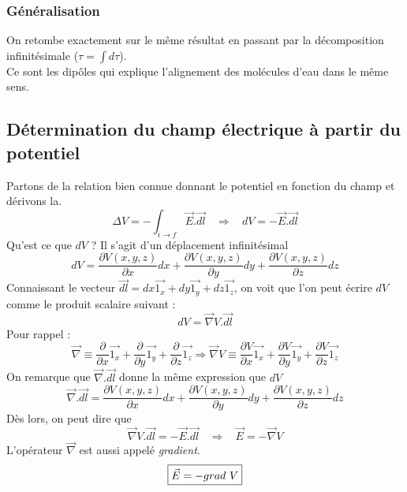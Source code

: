 \documentclass	[11pt, a4paper, openany]{book}
\begin{document}
\subsubsection{Généralisation}
On retombe exactement sur le même résultat en passant par la décomposition infinitésimale ($\tau = \int d\tau$).\\
Ce sont les dipôles qui explique l'alignement des molécules d'eau dans le même sens.

\subsection{Détermination du champ électrique à partir du potentiel}
Partons de la relation bien connue donnant le potentiel en fonction du champ et dérivons la.
\begin{equation}
\Delta V = - \int_{i\rightarrow f} \vec{E}.\vec{dl}\ \ \ \ \Rightarrow\ \ \ \ dV = - \vec{E}.\vec{dl}
\end{equation}
Qu'est ce que $dV$ ? Il s'agit d'un déplacement infinitésimal 
\begin{equation}
dV = \frac{\partial V(x,y,z)}{\partial x}dx + \frac{\partial V(x,y,z)}{\partial y}dy + \frac{\partial V(x,y,z)}{\partial z}dz
\end{equation}
Connaissant le vecteur $\vec{dl} = dx\vec{1_x} + dy\vec{1_y}+dz\vec{1_z}$, on voit que l'on peut écrire $dV$ comme le produit scalaire suivant :
\begin{equation}
dV = \vec{\nabla}V.\vec{dl}
\end{equation}
Pour rappel : 
\begin{equation}
\vec{\nabla} \equiv \frac{\partial}{\partial x}\vec{1_x} + \frac{\partial}{\partial y}\vec{1_y} + \frac{\partial}{\partial z}\vec{1_z} \Rightarrow \vec{\nabla}V \equiv \frac{\partial V}{\partial x}\vec{1_x} + \frac{\partial V}{\partial y}\vec{1_y} + \frac{\partial V}{\partial z}\vec{1_z}
\end{equation}
On remarque que $\vec{\nabla}.\vec{dl}$ donne la même expression que $dV$
\begin{equation}
\vec{\nabla}.\vec{dl} = \frac{\partial V(x,y,z)}{\partial x}dx + \frac{\partial V(x,y,z)}{\partial y}dy + \frac{\partial V(x,y,z)}{\partial z}dz
\end{equation}
Dès lors, on peut dire que 
\begin{equation}
\vec{\nabla}V.\vec{dl} = -\vec{E}.\vec{dl}\ \ \ \ \Rightarrow\ \ \ \ \vec{E} = - \vec{\nabla}V
\end{equation}
L'opérateur $\vec{\nabla}$ est aussi appelé \textit{gradient}.
\begin{equation}
\fbox{$\vec{E} = -grad\ V$}
\end{equation}
\end{document}
